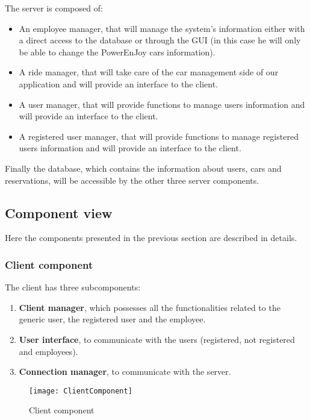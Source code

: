 The server is composed of: 
\begin{itemize}
	\item An employee manager, that will manage the system's information either with a direct access to the database or through the GUI (in this case he will only be able to change the PowerEnJoy cars information).
	\item A ride manager, that will take care of the car management side of our application and will provide an interface to the client.
	\item A user manager, that will provide functions to manage users information and will provide an interface to the client.
	\item A registered user manager, that will provide functions to manage registered users information and will provide an interface to the client.
\end{itemize}

Finally the database, which contains the information about users, cars and reservations, will be accessible by the other three server components.
\newpage 
\subsection{Component view} 
Here the components presented in the previous section are described in details.
\subsubsection{Client component}
The client has three subcomponents:
\begin{enumerate}
	\item \textbf{Client manager}, which possesses all the functionalities related to the generic user, the registered user and the employee. 
	\item \textbf{User interface}, to communicate with the users (registered, not registered and employees).
	\item \textbf{Connection manager}, to communicate with the server.
\end{enumerate}
\begin{figure}[H]
	\centering
	\texttt{[image: ClientComponent]}
	\caption{Client component}
\end{figure}
\newpage
